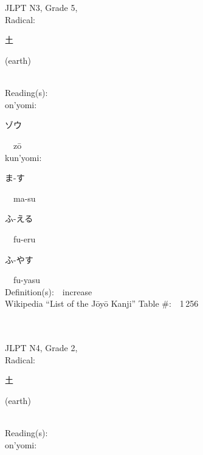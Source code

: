 \begin{multicols}{2}
\ \ \\
{\fontsize{34pt}{40pt}  }\ \ \\  %
{JLPT N3, Grade 5, \\Radical:\ \ {\begin{CJK}{UTF8}{min} 土 \end{CJK}} (earth) } \\
Reading(s):\ \ \\
{\hspace*{1em}}on'yomi:\ \ \\
{\hspace*{2em}}{\begin{CJK}{UTF8}{min} ゾウ \end{CJK}}\ \ z\=o\ \ \\
{\hspace*{1em}}kun'yomi:\ \ \\
{\hspace*{2em}}{\begin{CJK}{UTF8}{min} ま-す \end{CJK}}\ \ ma-su\ \ \\
{\hspace*{2em}}{\begin{CJK}{UTF8}{min} ふ-える \end{CJK}}\ \ fu-eru\ \ \\
{\hspace*{2em}}{\begin{CJK}{UTF8}{min} ふ-やす \end{CJK}}\ \ fu-yasu\ \ \\
Definition(s):\ \ increase \\
Wikipedia ``List of the J\=oy\=o Kanji'' Table \#:\ \ 1\,256 \\
\ \ \\
{\fontsize{34pt}{40pt}  }\ \ \\  %
{JLPT N4, Grade 2, \\Radical:\ \ {\begin{CJK}{UTF8}{min} 土 \end{CJK}} (earth) } \\
Reading(s):\ \ \\
{\hspace*{1em}}on'yomi:\ \ \\

\end{multicols}
